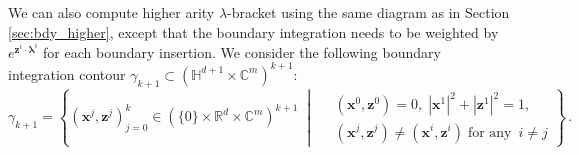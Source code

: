 \documentclass[11pt]{article}
\newcommand{\C}{\mathbb{C}}
\newcommand{\R}{\mathbb{R}}
\numberwithin{equation}{section}
\begin{document}
We can also compute higher arity $\lambda$-bracket using the same diagram as in Section \ref{sec:bdy_higher}, except that the boundary integration needs to be weighted by $e^{\boldsymbol{z}^i\cdot\boldsymbol{\lambda}^i}$ for each boundary insertion. We consider the following boundary integration contour $\gamma_{k+1} \subset (\mathbb{H}^{d+1}\times \C^m)^{k+1}$:
\begin{equation}
\gamma_{k+1} = \left\{(\boldsymbol{x}^j,\boldsymbol{z}^j)_{j=0}^k \in  (\{0\}\times\R^d\times \C^m )^{k+1} \;\middle|\;
\begin{aligned}
	& (\boldsymbol{x}^0,\boldsymbol{z}^0) = 0,\; |\boldsymbol{x}^1|^2 + |\boldsymbol{z}^1|^2 = 1, \\
	& (\boldsymbol{x}^j,\boldsymbol{z}^j) \neq (\boldsymbol{x}^i,\boldsymbol{z}^i) \;\text{for any }\, i\neq j
\end{aligned}\right\}\,.
\end{equation}
\end{document}
